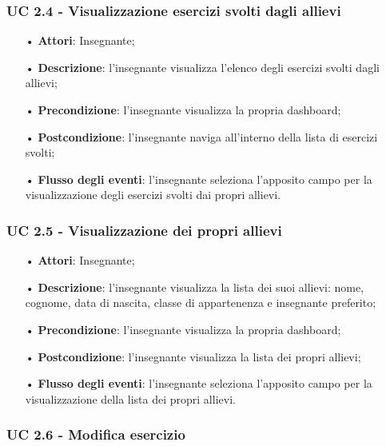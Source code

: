 \subsubsection{UC 2.4 - Visualizzazione esercizi svolti dagli allievi}
\begin{itemize}
	\item[•] \textbf{Attori}: Insegnante;
	\item[•] \textbf{Descrizione}:  l'insegnante visualizza l'elenco degli esercizi svolti dagli allievi;
	\item[•] \textbf{Precondizione}: l'insegnante visualizza la propria dashboard;
	\item[•] \textbf{Postcondizione}: l'insegnante naviga all'interno della lista di esercizi svolti;
	\item[•] \textbf{Flusso degli eventi}: l'insegnante seleziona l'apposito campo per la visualizzazione degli esercizi svolti dai propri allievi.
\end{itemize}

\subsubsection{UC 2.5 - Visualizzazione dei propri allievi}
\begin{itemize}
	\item[•] \textbf{Attori}: Insegnante;
	\item[•] \textbf{Descrizione}: l'insegnante visualizza la lista dei suoi allievi: nome, cognome, data di nascita, classe di appartenenza e insegnante preferito;
	\item[•] \textbf{Precondizione}: l'insegnante visualizza la propria dashboard;
	\item[•] \textbf{Postcondizione}: l'insegnante visualizza la lista dei propri allievi;
	\item[•] \textbf{Flusso degli eventi}:  l'insegnante seleziona l'apposito campo per la visualizzazione della lista dei propri allievi.
\end{itemize}


\subsubsection{UC 2.6 - Modifica esercizio}

